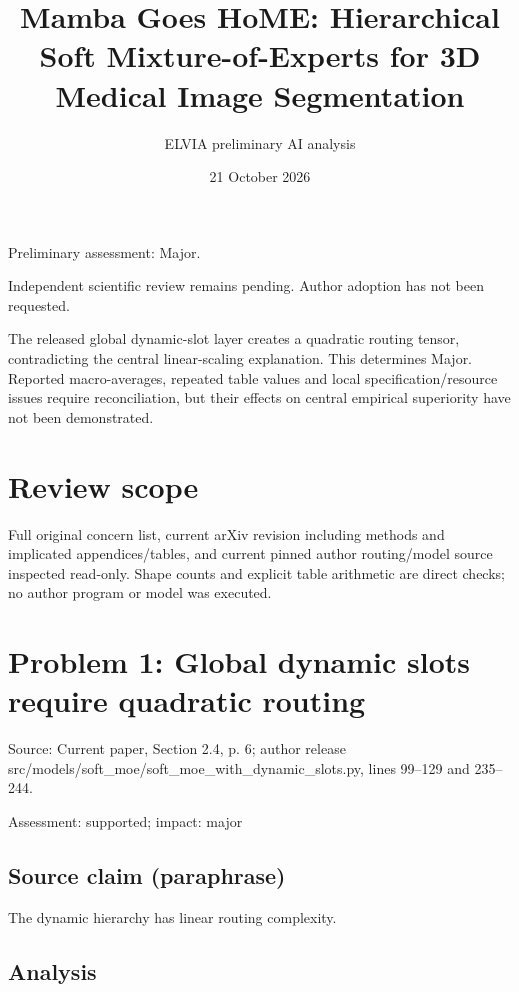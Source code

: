 \documentclass[11pt]{article}
\begin{document}
\title{Mamba Goes HoME: Hierarchical Soft Mixture-of-Experts for 3D Medical Image Segmentation}

\author{ELVIA preliminary AI analysis}\date{21 October 2026}\maketitle

Preliminary assessment: Major.\par

Independent scientific review remains pending. Author adoption has not been requested.

The released global dynamic-slot layer creates a quadratic routing tensor, contradicting the central linear-scaling explanation. This determines Major. Reported macro-averages, repeated table values and local specification/resource issues require reconciliation, but their effects on central empirical superiority have not been demonstrated.

\section*{Review scope}

Full original concern list, current arXiv revision including methods and implicated appendices/tables, and current pinned author routing/model source inspected read-only. Shape counts and explicit table arithmetic are direct checks; no author program or model was executed.

\section*{Problem 1: Global dynamic slots require quadratic routing}

Source: Current paper, Section 2.4, p. 6; author release src/models/soft\_moe/soft\_moe\_with\_dynamic\_slots.py, lines 99–129 and 235–244.

Assessment: supported; impact: major

\subsection*{Source claim (paraphrase)}

The dynamic hierarchy has linear routing complexity.

\subsection*{Analysis}
\end{document}
